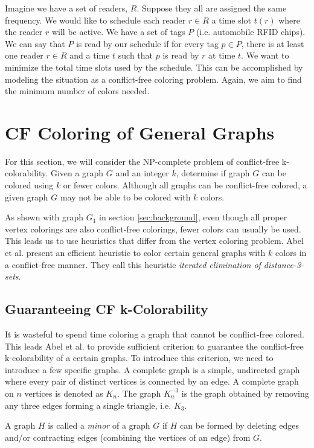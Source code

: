 \documentclass{sig-alternate}
\begin{document}
Imagine we have a set of readers, $R$. Suppose they all are assigned the same frequency. We would like to schedule each reader $r \in R$ a time slot $t(r)$ where the reader $r$ will be active. We have a set of tags $P$ (i.e. automobile RFID chips). We can say that $P$ is read by our schedule if for every tag $p \in P$, there is at least one reader $r \in R$ and a time $t$ such that $p$ is read by $r$ at time $t$. We want to minimize the total time slots used by the schedule. This can be accomplished by modeling the situation as a conflict-free coloring problem. Again, we aim to find the minimum number of colors needed. \cite{cheilaris2014strong, smorodinsky2013conflict}

\section{CF Coloring of General Graphs}
\label{sec:general-coloring}
For this section, we will consider the NP-complete problem of conflict-free k-colorability. Given a graph $G$ and an integer $k$, determine if graph $G$ can be colored using $k$ or fewer colors. Although all graphs can be conflict-free colored, a given graph $G$ may not be able to be colored with $k$ colors.

As shown with graph $G_1$ in section \ref{sec:background}, even though all proper vertex colorings are also conflict-free colorings, fewer colors can usually be used. This leads us to use heuristics that differ from the vertex coloring problem. Abel et al. \cite{abel2017three} present an efficient heuristic to color certain general graphs with $k$ colors in a conflict-free manner. They call this heuristic \emph{iterated elimination of distance-3-sets}.

\subsection{Guaranteeing CF k-Colorability}
It is wasteful to spend time coloring a graph that cannot be conflict-free colored. This leads Abel et al. to provide sufficient criterion to guarantee the conflict-free k-colorability of a certain graphs. To introduce this criterion, we need to introduce a few specific graphs. A complete graph is a simple, undirected graph where every pair of distinct vertices is connected by an edge. A complete graph on $n$ vertices is denoted as $K_n$. The graph $K_n^{-3}$ is the graph obtained by removing any three edges forming a single triangle, i.e. $K_3$.

A graph $H$ is called a \emph{minor} of a graph $G$ if $H$ can be formed by deleting edges and/or contracting edges (combining the vertices of an edge) from $G$. \cite{abel2017three,bondy1976graph}
\end{document}

